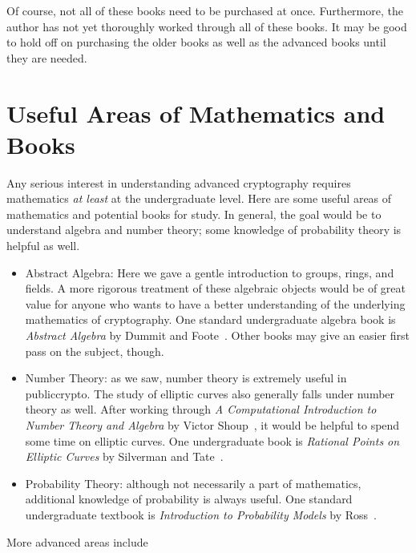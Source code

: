 \noindent
Of course, not all of these books need to be purchased at once.
Furthermore, the author has not yet thoroughly worked through
all of these books.
It may be good to hold off on purchasing the older books
as well as the advanced books until they are needed.



\section{Useful Areas of Mathematics and Books}

Any serious interest
in understanding advanced cryptography requires mathematics
\emph{at least} at the undergraduate level.
Here are some useful areas of mathematics and potential books for study.
In general, the goal would be to understand algebra and \gls{number theory};
some knowledge of probability theory is helpful as well.

\begin{itemize}
\item Abstract Algebra: Here we gave a gentle introduction
    to \glspl{group}, \glspl{ring}, and \glspl{field}.
    A more rigorous treatment of these algebraic objects would
    be of great value for anyone who wants to have a better understanding
    of the underlying mathematics of cryptography.
    One standard undergraduate algebra book is
    \emph{Abstract Algebra} by Dummit and Foote~\cite{DummitFooteAlgebra}.
    Other books may give an easier first pass on the subject, though.
\item Number Theory: as we saw, \gls{number theory} is extremely useful
    in \gls{publiccrypto}.
    The study of \glspl{elliptic curve} also generally falls under
    \gls{number theory} as well.
    After working through
    \emph{A Computational Introduction to Number Theory and Algebra}
    by Victor Shoup~\cite{ComputationalIntroNTA},
    it would be helpful to spend some time on \glspl{elliptic curve}.
    One undergraduate book is \emph{Rational Points on Elliptic Curves} by
    Silverman and Tate~\cite{RationalPointsEC}.
\item Probability Theory: although not necessarily a part of mathematics,
    additional knowledge of probability is always useful.
    One standard undergraduate textbook is
    \emph{Introduction to Probability Models} by Ross~\cite{IntroProbModels}.
\end{itemize}

More advanced areas include

